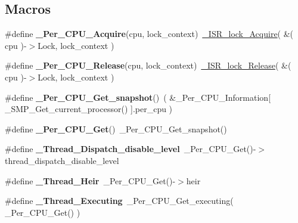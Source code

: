 \subsection*{Macros}
\begin{DoxyCompactItemize}
\item 
\mbox{\label{group__PerCPU_ga9aac43e4379e069efd5ef00fe2f61e92}} 
\#define {\bfseries \+\_\+\+Per\+\_\+\+C\+P\+U\+\_\+\+Acquire}(cpu,  lock\+\_\+context)~\mbox{\hyperlink{group__RTEMSScoreISRLocks_ga69700d5284dea5b4ce06b5ebc405d797}{\+\_\+\+I\+S\+R\+\_\+lock\+\_\+\+Acquire}}( \&( cpu )-\/$>$Lock, lock\+\_\+context )
\item 
\mbox{\label{group__PerCPU_ga543ddc837634f299799bc497ab17a8e6}} 
\#define {\bfseries \+\_\+\+Per\+\_\+\+C\+P\+U\+\_\+\+Release}(cpu,  lock\+\_\+context)~\mbox{\hyperlink{group__RTEMSScoreISRLocks_ga35acfee397d43e90bc30f63e4bd960d7}{\+\_\+\+I\+S\+R\+\_\+lock\+\_\+\+Release}}( \&( cpu )-\/$>$Lock, lock\+\_\+context )
\item 
\mbox{\label{group__PerCPU_gaeb26011e2a73cf987a9530df13b968d1}} 
\#define {\bfseries \+\_\+\+Per\+\_\+\+C\+P\+U\+\_\+\+Get\+\_\+snapshot}()~( \&\+\_\+\+Per\+\_\+\+C\+P\+U\+\_\+\+Information\mbox{[} \+\_\+\+S\+M\+P\+\_\+\+Get\+\_\+current\+\_\+processor() \mbox{]}.per\+\_\+cpu )
\item 
\mbox{\label{group__PerCPU_gaf7325ef68fec22fb55109267131eb641}} 
\#define {\bfseries \+\_\+\+Per\+\_\+\+C\+P\+U\+\_\+\+Get}()~\+\_\+\+Per\+\_\+\+C\+P\+U\+\_\+\+Get\+\_\+snapshot()
\item 
\mbox{\label{group__PerCPU_gaf422bc03f192f17a95c705b96c248b76}} 
\#define {\bfseries \+\_\+\+Thread\+\_\+\+Dispatch\+\_\+disable\+\_\+level}~\+\_\+\+Per\+\_\+\+C\+P\+U\+\_\+\+Get()-\/$>$thread\+\_\+dispatch\+\_\+disable\+\_\+level
\item 
\mbox{\label{group__PerCPU_ga90c60216a6d81ad3997c71ff3482a896}} 
\#define {\bfseries \+\_\+\+Thread\+\_\+\+Heir}~\+\_\+\+Per\+\_\+\+C\+P\+U\+\_\+\+Get()-\/$>$heir
\item 
\mbox{\label{group__PerCPU_ga329266ac3e43b242461d238fdb34d98c}} 
\#define {\bfseries \+\_\+\+Thread\+\_\+\+Executing}~\+\_\+\+Per\+\_\+\+C\+P\+U\+\_\+\+Get\+\_\+executing( \+\_\+\+Per\+\_\+\+C\+P\+U\+\_\+\+Get() )

\end{DoxyCompactItemize}
